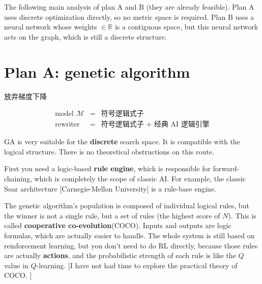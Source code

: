 \documentclass[12pt, orivec]{article}
\begin{document}
The following main analysis of plan A and B (they are already feasible). Plan A uses discrete optimization directly, so no metric space is required. Plan B uses a neural network whose weights $\in \mathbb{R}$ is a contiguous space, but this neural network acts on the graph, which is still a discrete structure.

\section{Plan A: genetic algorithm}
\label{COCO}

\begin{tcolorbox}[ams equation, colback=yellow, colframe=white]
\mbox{放弃梯度下降}
\end{tcolorbox}
\begin{eqnarray}
\mbox{model } \mathcal{M} &=& \mbox{符号逻辑式子} \nonumber \\
\mbox{rewriter} &=& \mbox{符号逻辑式子 + 经典 AI 逻辑引擎}
\end{eqnarray}

GA is very suitable for the \textbf{discrete} search space. It is compatible with the logical structure. There is no theoretical obstructions on this route.


First you need a logic-based \textbf{rule engine}, which is responsible for forward-chaining, which is completely the scope of classic AI. For example, the classic Soar architecture [Carnegie-Mellon University] is a rule-base engine. %

The genetic algorithm's population is composed of individual logical rules, but the winner is not a single rule, but a set of rules (the highest score of $N$). This is called \textbf{cooperative co-evolution}(COCO).
Inputs and outputs are logic formulas, which are actually easier to handle.
The whole system is still based on reinforcement learning, but you don't need to do RL directly, because those rules are actually \textbf{actions}, and the probabilistic strength of each rule is like the $Q$ value in $Q$-learning.
[I have not had time to explore the practical theory of COCO. ]
\end{document}
